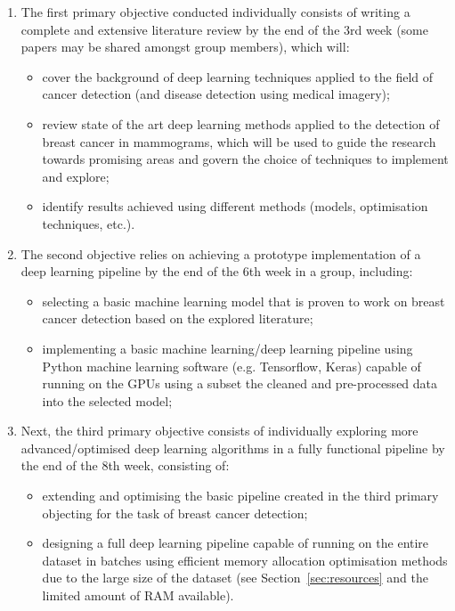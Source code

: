 \documentclass[letterpaper,12pt]{article}
\begin{document}
\begin{enumerate}
    \item The first primary objective conducted individually consists of writing a complete and extensive literature review by the end of the 3rd week (some papers may be shared amongst group members), which will:
    \begin{itemize}
        \item cover the background of deep learning techniques applied to the field of cancer detection (and disease detection using medical imagery);
        \item review state of the art deep learning methods applied to the detection of breast cancer in mammograms, which will be used to guide the research towards promising areas and govern the choice of techniques to implement and explore;
        \item identify results achieved using different methods (models, optimisation techniques, etc.).
    \end{itemize}
    \item The second objective relies on achieving a prototype implementation of a deep learning pipeline by the end of the 6th week in a group, including:
    \begin{itemize}
        \item selecting a basic machine learning model that is proven to work on breast cancer detection based on the explored literature;
        \item implementing a basic machine learning/deep learning pipeline using Python machine learning software (e.g. Tensorflow, Keras) capable of running on the GPUs using a subset the cleaned and pre-processed data into the selected model;
    \end{itemize}
    \item Next, the third primary objective consists of individually exploring more advanced/optimised deep learning algorithms in a fully functional pipeline by the end of the 8th week, consisting of:
    \begin{itemize}
        \item extending and optimising the basic pipeline created in the third primary objecting for the task of breast cancer detection;
        \item designing a full deep learning pipeline capable of running on the entire dataset in batches using efficient memory allocation optimisation methods due to the large size of the dataset (see Section~\ref{sec:resources} and the limited amount of RAM available).

\end{itemize}
\end{enumerate}
\end{document}
